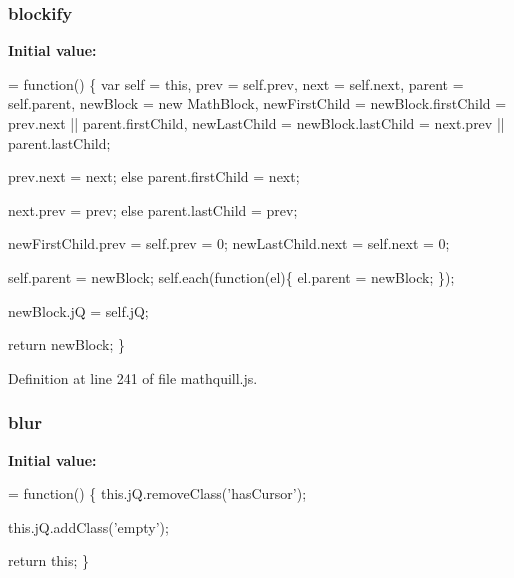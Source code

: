 \subsubsection[{blockify}]{\setlength{\rightskip}{0pt plus 5cm}{\bf \-\_\-} blockify}\label{mathquill_8js_a3a0d80a19be518fe85f1805e2f3e3e39}
{\bfseries Initial value\-:}
\begin{DoxyCode}
= \textcolor{keyword}{function}() \{
  var \textcolor{keyword}{self} = \textcolor{keyword}{this},
      prev = \textcolor{keyword}{self}.prev,
      next = \textcolor{keyword}{self}.next,
      parent = \textcolor{keyword}{self}.parent,
      newBlock = \textcolor{keyword}{new} MathBlock,
      newFirstChild = newBlock.firstChild = prev.next || parent.firstChild,
      newLastChild = newBlock.lastChild = next.prev || parent.lastChild;


    prev.next = next;
  \textcolor{keywordflow}{else}
    parent.firstChild = next;


    next.prev = prev;
  \textcolor{keywordflow}{else}
    parent.lastChild = prev;

  newFirstChild.prev = \textcolor{keyword}{self}.prev = 0;
  newLastChild.next = \textcolor{keyword}{self}.next = 0;

  \textcolor{keyword}{self}.parent = newBlock;
  \textcolor{keyword}{self}.each(\textcolor{keyword}{function}(el)\{ el.parent = newBlock; \});

  newBlock.jQ = \textcolor{keyword}{self}.jQ;

  \textcolor{keywordflow}{return} newBlock;
\}
\end{DoxyCode}


Definition at line 241 of file mathquill.\-js.

\subsubsection[{blur}]{\setlength{\rightskip}{0pt plus 5cm}{\bf \-\_\-} blur}\label{mathquill_8js_a75a75fd5542106d704278bbdd2088a8e}
{\bfseries Initial value\-:}
\begin{DoxyCode}
= \textcolor{keyword}{function}() \{
  this.jQ.removeClass(\textcolor{stringliteral}{'hasCursor'});

    this.jQ.addClass(\textcolor{stringliteral}{'empty'});

  \textcolor{keywordflow}{return} \textcolor{keyword}{this};
\}
\end{DoxyCode}


